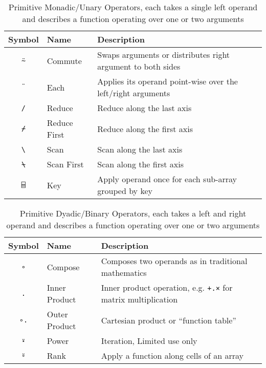 \documentclass[numbers,9pt]{sigplanconf}
\begin{document}
\begin{table*}
\centering
\begin{tabular}{cll}
\toprule
Symbol     & Name & Description \\
\midrule
\texttt{⍨} & Commute & Swaps arguments or distributes
 right argument to both sides \\
\texttt{¨} & Each & Applies its operand point-wise over the left/right
 arguments \\
\texttt{/} & Reduce & Reduce along the last axis \\
\texttt{⌿} & Reduce First & Reduce along the first axis \\
\texttt{\textbackslash} & Scan & Scan along the last axis \\
\texttt{⍀} & Scan First & Scan along the first axis \\
\texttt{⌸} & Key & Apply operand once for each sub-array grouped by key \\
\end{tabular}
\caption{Primitive Monadic/Unary Operators, each takes a single left
operand and describes a function operating over one or two arguments}
\label{tab:adverbs}
\end{table*}

\begin{table*}
\centering
\begin{tabular}{cll}
\toprule
Symbol     & Name & Description \\
\midrule
\texttt{∘} & Compose & Composes two operands as in traditional mathematics \\
\texttt{.} & Inner Product & Inner product operation, e.g.
 \texttt{+.×} for matrix multiplication \\
\texttt{∘.} & Outer Product & Cartesian product or ``function table'' \\
\texttt{⍣} & Power & Iteration, Limited use only \\
\texttt{⍤} & Rank & Apply a function along cells of an array \\
\end{tabular}
\caption{Primitive Dyadic/Binary Operators, each takes a left
 and right operand and describes a function operating over one or two arguments}
\label{tab:conjunctions}
\end{table*}
\end{document}

